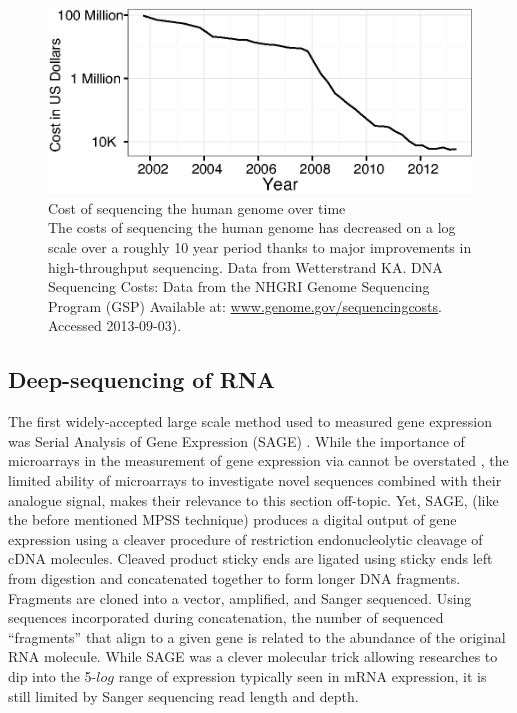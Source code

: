     \begin{figure}[htbp] %
      \centering 
      \includegraphics{Figures/Intro/Sequencing_costs_over_time.eps}
      \caption[Cost of sequencing the human genome over time]
      {
        Cost of sequencing the human genome over time\\[0.25cm]
        The costs of sequencing the human genome has decreased on a log scale over a roughly 10 year period thanks to major improvements in high-throughput sequencing. Data from Wetterstrand KA. DNA Sequencing Costs: Data from the NHGRI Genome Sequencing Program (GSP) Available at: \url{www.genome.gov/sequencingcosts}. Accessed 2013-09-03).
        }
      \label{fig:SeqCosts}
      \end{figure}

  \subsection{Deep-sequencing of RNA}\label{sec: Types of HTS}

    The first widely-accepted large scale method used to measured gene expression was Serial Analysis of Gene Expression (SAGE) \citep{Velculescu1995a}. While the importance of microarrays in the measurement of gene expression via cannot be overstated \citep{Shendure2008,Marioni2008}, the limited ability of microarrays to investigate novel sequences combined with their analogue signal, makes their relevance to this section off-topic. Yet, SAGE, (like the before mentioned MPSS technique) produces a digital output of gene expression using a cleaver procedure of restriction endonucleolytic cleavage of cDNA molecules. Cleaved product sticky ends are ligated using sticky ends left from digestion and concatenated together to form longer DNA fragments. Fragments are cloned into a vector, amplified, and Sanger sequenced. Using sequences incorporated during concatenation, the number of sequenced ``fragments'' that align to a given gene is related to the abundance of the original RNA molecule. While SAGE was a clever molecular trick allowing researches to dip into the 5-$log$ range of expression typically seen in mRNA expression, it is still limited by Sanger sequencing read length and depth.

